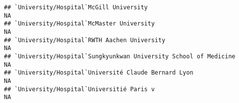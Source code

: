 \documentclass[]{article}
\begin{document}
\begin{verbatim}
## `University/Hospital`McGill University                                                                                                                                                                                                                                                                                                                                                                                                                                               NA
## `University/Hospital`McMaster University                                                                                                                                                                                                                                                                                                                                                                                                                                             NA
## `University/Hospital`RWTH Aachen University                                                                                                                                                                                                                                                                                                                                                                                                                                          NA
## `University/Hospital`Sungkyunkwan University School of Medicine                                                                                                                                                                                                                                                                                                                                                                                                                      NA
## `University/Hospital`Université Claude Bernard Lyon                                                                                                                                                                                                                                                                                                                                                                                                                                  NA
## `University/Hospital`Universitié Paris v                                                                                                                                                                                                                                                                                                                                                                                                                                             NA

\end{verbatim}
\end{document}
